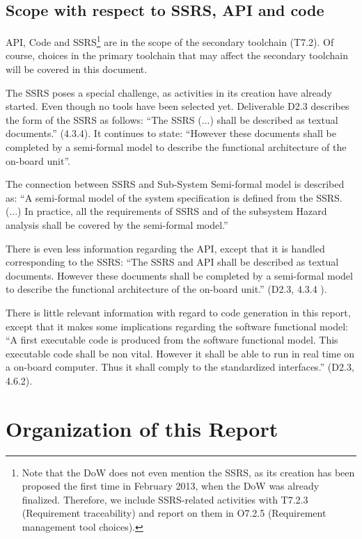\subsection{Scope with respect to SSRS, API and code}

API, Code and SSRS\footnote{Note that the DoW does not even mention the SSRS, as its creation has been proposed the first time in February 2013, when the DoW was already finalized.  Therefore, we include SSRS-related activities with T7.2.3 (Requirement traceability) and report on them in O7.2.5 (Requirement management tool choices).}  are in the scope of the secondary toolchain (T7.2).  Of course, choices in the primary toolchain that may affect the secondary toolchain will be covered in this document.

The SSRS poses a special challenge, as activities in its creation have already started.  Even though no tools have been selected yet.  Deliverable D2.3 \citep{D2_3} describes the form of the SSRS as follows:
``The SSRS (...) shall be described as textual documents.'' (4.3.4).  It continues to state: ``However these documents shall be completed by a semi-formal model to describe the functional architecture of the on-board unit''.

The connection between SSRS and Sub-System Semi-formal model is described as: ``A semi-formal model of the system specification is defined from the SSRS. (...) In practice, all the requirements of SSRS and of the subsystem Hazard analysis shall be covered by the semi-formal model.''

There is even less information regarding the API, except that it is handled corresponding to the SSRS: ``The SSRS and API shall be described as textual documents. However these documents shall be completed by a semi-formal model to describe the functional architecture of the on-board unit.'' (D2.3, 4.3.4 \citep{D2_3}).

There is little relevant information with regard to code generation in this report, except that it makes some implications regarding the software functional model: ``A first executable code is produced from the software functional model.  This executable code shall be non vital. However it shall be able to run in real time on a on-board computer.  Thus it shall comply to the standardized interfaces.'' (D2.3, 4.6.2).

\section{Organization of this Report}

